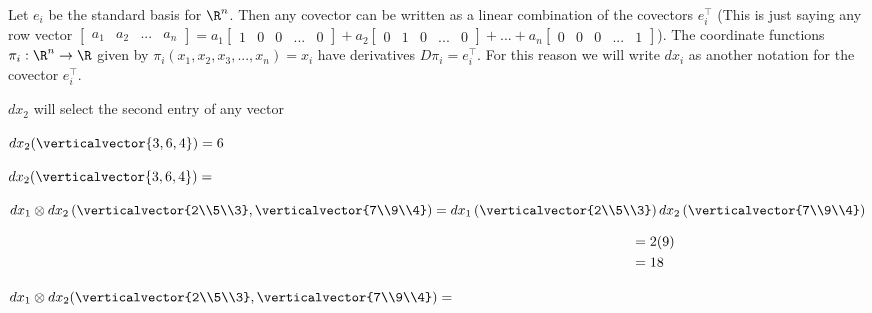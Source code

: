 \documentclass{ximera}
\begin{document}
	Let $e_i$ be the standard basis for $\R^n$.  Then any covector can be written as a linear combination of the covectors $e_i^\top$ (This is just saying any row 
	vector $\begin{bmatrix} a_1 & a_2  &... &a_n\end{bmatrix} = a_1\begin{bmatrix} 1& 0&0&...&0\end{bmatrix} + a_2\begin{bmatrix} 0& 1&0&...&0\end{bmatrix} 
	+ ... + a_n \begin{bmatrix} 0& 0&0&...&1\end{bmatrix}$).   The coordinate functions $\pi_i:\R^n \to \R$ given by $\pi_i (x_1,x_2,x_3,...,x_n) = x_i$ have 
	derivatives $D\pi_i = e_i^\top$.  For this reason we will write $dx_i$ as another notation for the covector $e_i^\top$.
	
	\begin{question}
		\begin{solution}
			\begin{hint}
				$dx_2$ will select the second entry of any vector 
			\end{hint}
			\begin{hint}
				$dx_2(\verticalvector{3,6,4})=6$
			\end{hint}
			$dx_2(\verticalvector{3,6,4})=$ 
		\end{solution}
	\end{question}
	
	\begin{question}
		\begin{solution}
			\begin{hint}
				$dx_1 \otimes dx_2 \left(\verticalvector{2\\5\\3},\verticalvector{7\\9\\4}\right) = dx_1\left(\verticalvector{2\\5\\3}\right)dx_2\left(\verticalvector{7\\9\\4}\right)$
			\end{hint}
			\begin{hint}
				\begin{align*}
					\hphantom{dx_1 \otimes dx_2 \left(\verticalvector{2\\5\\3},\verticalvector{7\\9\\4}\right)} &= 2(9)\\
					&= 18 
				\end{align*}
			\end{hint}
		 $dx_1 \otimes dx_2 (\verticalvector{2\\5\\3},\verticalvector{7\\9\\4}) = $\answer{$18$}
		 \end{solution}
	\end{question}
		
\end{document}
